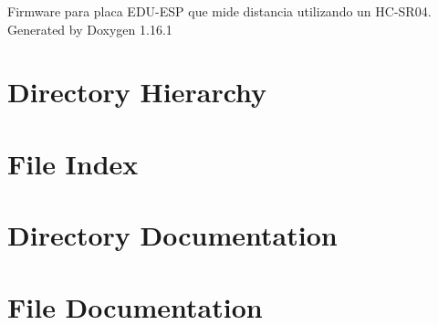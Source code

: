 \documentclass[twoside]{book}
\newcommand{\+}{\discretionary{\mbox{\scriptsize$\hookleftarrow$}}{}{}}
\newcommand{\clearemptydoublepage}{%
    \newpage{\pagestyle{empty}\cleardoublepage}%
  }
\begin{document}
  \raggedbottom
    \hypersetup{pageanchor=false,
                bookmarksnumbered=true,
                pdfencoding=unicode
               }
  \begin{titlepage}
  \vspace*{7cm}
  \begin{center}%
  {\Large Firmware para placa EDU-\/\+ESP que mide distancia utilizando un HC-\/\+SR04.}\\
  \vspace*{1cm}
  {\large Generated by Doxygen 1.16.1}\\
  \end{center}
  \end{titlepage}
  \clearemptydoublepage
  \tableofcontents
  \clearemptydoublepage
  \hypersetup{pageanchor=true}

\chapter{Directory Hierarchy}

\chapter{File Index}

\chapter{Directory Documentation}

\chapter{File Documentation}



  \backmatter
  \newpage
  \clearemptydoublepage
  \printindex
\end{document}
